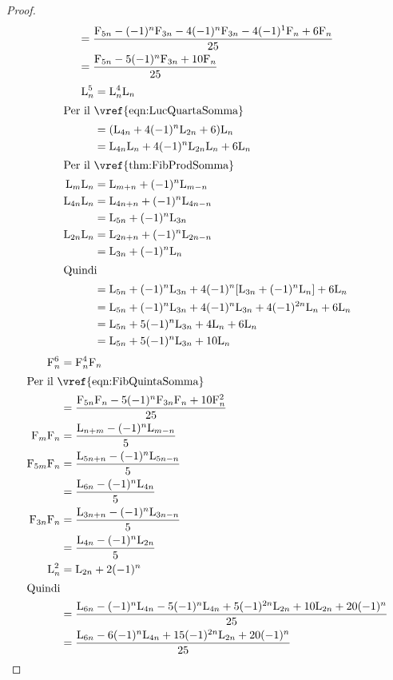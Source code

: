 \begin{proof}
\begin{align*}
	={}&\dfrac{\mathrm{F}_{5n}-(-1)^{n}\mathrm{F}_{3n}-4(-1)^n\mathrm{F}_{3n}-4(-1)^{1}\mathrm{F}_{n}+6\mathrm{F}_{n}}{25}\\
	={}&\dfrac{\mathrm{F}_{5n}-5(-1)^n\mathrm{F}_{3n}+10\mathrm{F}_{n}}{25}\\
\end{align*}
\begin{align*}
	\Luc{n}^5={}&\Luc{n}^4\Luc{n}\\
	\intertext{Per il~\vref{eqn:LucQuartaSomma}}
	={}&(\Luc{4n}+4(-1)^n\Luc{2n}+6)\Luc{n}\\
	={}&\Luc{4n}\Luc{n}+4(-1)^n\Luc{2n}\Luc{n}+6\Luc{n}\\
	\intertext{Per il~\vref{thm:FibProdSomma}}
	\Luc{m}\Luc{n}={}&\Luc{m+n}+(-1)^{n}\Luc{m-n}\\
	\Luc{4n}\Luc{n}={}&\Luc{4n+n}+(-1)^{n}\Luc{4n-n}\\
	={}&\Luc{5n}+(-1)^{n}\Luc{3n}\\
	\Luc{2n}\Luc{n}={}&\Luc{2n+n}+(-1)^{n}\Luc{2n-n}\\
	={}&\Luc{3n}+(-1)^{n}\Luc{n}\\
	\intertext{Quindi}
	={}&\Luc{5n}+(-1)^{n}\Luc{3n}+4(-1)^n[\Luc{3n}+(-1)^{n}\Luc{n}]+6\Luc{n}\\
	={}&\Luc{5n}+(-1)^{n}\Luc{3n}+4(-1)^n\Luc{3n}+4(-1)^{2n}\Luc{n}+6\Luc{n}\\
	={}&\Luc{5n}+5(-1)^n\Luc{3n}+4\Luc{n}+6\Luc{n}\\
	={}&\Luc{5n}+5(-1)^n\Luc{3n}+10\Luc{n}\\
\end{align*}
\begin{align*}
	\Fib{n}^6={}&\Fib{n}^4\Fib{n}\\
	\intertext{Per il~\vref{eqn:FibQuintaSomma}}
	={}&\dfrac{\Fib{5n}\Fib{n}-5(-1)^n\Fib{3n}\Fib{n}+10\Fib{n}^2}{25}\\
	\Fib{m}\Fib{n}={}&\dfrac{\Luc{n+m}-(-1)^n\Luc{m-n}}{5}\\
	\Fib{5m}\Fib{n}={}&\dfrac{\Luc{5n+n}-(-1)^n\Luc{5n-n}}{5}\\
	={}&\dfrac{\Luc{6n}-(-1)^n\Luc{4n}}{5}\\
	\Fib{3n}\Fib{n}={}&\dfrac{\Luc{3n+n}-(-1)^n\Luc{3n-n}}{5}\\
	={}&\dfrac{\Luc{4n}-(-1)^n\Luc{2n}}{5}\\
	\Luc{n}^2={}&\Luc{2n}+2(-1)^n\\
	\intertext{Quindi}
	={}&\dfrac{\Luc{6n}-(-1)^n\Luc{4n}-5(-1)^n\Luc{4n}+5(-1)^{2n}\Luc{2n}+10\Luc{2n}+20(-1)^n}{25}\\
	={}&\dfrac{\Luc{6n}-6(-1)^n\Luc{4n}+15(-1)^{2n}\Luc{2n}+20(-1)^n}{25}\\

\end{align*}
\end{proof}
